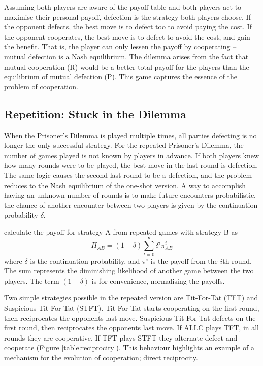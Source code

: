 \documentclass[a4paper,11pt,bcshonoursthesis,singlespace,oneside,thesisdraft,pdflatex]{cssethesis}
\begin{document}
Assuming both players are aware of the payoff table and both players act to maximise their personal payoff, defection is the strategy both players choose. 
If the opponent defects, the best move is to defect too to avoid paying the cost. 
If the opponent cooperates, the best move is to defect to avoid the cost, and gain the benefit. 
That is, the player can only lessen the payoff by cooperating -- mutual defection is a Nash equilibrium. 
The dilemma arises from the fact that mutual cooperation (R) would be a better total payoff for the players than the equilibrium of mutual defection (P). 
This game captures the essence of the problem of cooperation.
\subsection{Repetition: Stuck in the Dilemma}
When the Prisoner's Dilemma is played multiple times, all parties defecting is no longer the only successful strategy. 
For the repeated Prisoner's Dilemma, the number of games played is not known by players in advance. 
If both players knew how many rounds were to be played, the best move in the last round is defection. 
The same logic causes the second last round to be a defection, and the problem reduces to the Nash equilibrium of the one-shot version. 
A way to accomplish having an unknown number of rounds is to make future encounters probabilistic, the chance of another encounter between two players is given by the continuation probability $\delta$.

\citet{garcia:PLoSOne:2012} calculate the payoff for strategy A from repeated games with strategy B as
\begin{equation}
\label{eqn:repeatedPayoff}
\Pi_{AB}=(1-\delta)\sum^{\infty}_{t=0} \delta^i\pi^i_{AB}
\end{equation}
where $\delta$ is the continuation probability, and $\pi^i$ is the payoff from the $i$th round. 
The sum represents the diminishing likelihood of another game between the two players. 
The term $(1-\delta)$ is for convenience, normalising the payoffs.
 
Two simple strategies possible in the repeated version are Tit-For-Tat (TFT) and Suspicious Tit-For-Tat (STFT). 
Tit-For-Tat starts cooperating on the first round, then reciprocates the opponents last move. 
Suspicious Tit-For-Tat defects on the first round, then reciprocates the opponents last move. 
If ALLC plays TFT, in all rounds they are cooperative.  
If TFT plays STFT they alternate defect and cooperate (Figure \ref{table:reciprocity}). 
This behaviour highlights an example of a mechanism for the evolution of cooperation; direct reciprocity. 
\end{document}
